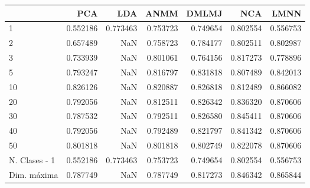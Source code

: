 \begin{tabular}{lrrrrrr}
\toprule
{} &       PCA &       LDA &      ANMM &     DMLMJ &       NCA &      LMNN \\
\midrule
1             &  0.552186 &  0.773463 &  0.753723 &  0.749654 &  0.802554 &  0.556753 \\
2             &  0.657489 &       NaN &  0.758723 &  0.784177 &  0.802511 &  0.802987 \\
3             &  0.733939 &       NaN &  0.801061 &  0.764156 &  0.817273 &  0.778896 \\
5             &  0.793247 &       NaN &  0.816797 &  0.831818 &  0.807489 &  0.842013 \\
10            &  0.826126 &       NaN &  0.820887 &  0.826818 &  0.812489 &  0.866082 \\
20            &  0.792056 &       NaN &  0.812511 &  0.826342 &  0.836320 &  0.870606 \\
30            &  0.787532 &       NaN &  0.792511 &  0.826580 &  0.845411 &  0.870606 \\
40            &  0.792056 &       NaN &  0.792489 &  0.821797 &  0.841342 &  0.870606 \\
50            &  0.801818 &       NaN &  0.801818 &  0.802749 &  0.822078 &  0.870606 \\
N. Clases - 1 &  0.552186 &  0.773463 &  0.753723 &  0.749654 &  0.802554 &  0.556753 \\
Dim. máxima   &  0.787749 &       NaN &  0.787749 &  0.817273 &  0.846342 &  0.865844 \\
\bottomrule
\end{tabular}
